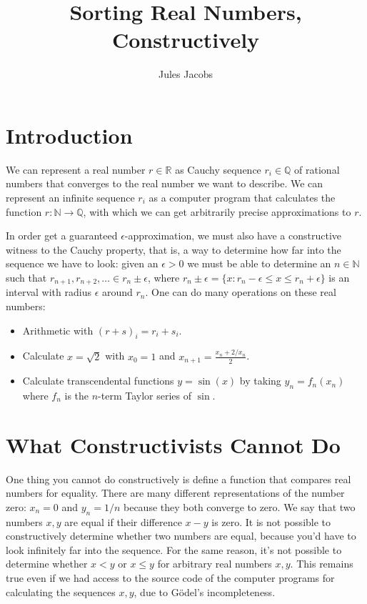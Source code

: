 \documentclass[a4paper, 11pt]{article}
\title{Sorting Real Numbers, Constructively}
\author{Jules Jacobs}
\newcommand{\N}{\mathbb{N}}
\newcommand{\Q}{\mathbb{Q}}
\newcommand{\R}{\mathbb{R}}
\begin{document}
\maketitle

\section{Introduction}

We can represent a real number $r\in \R$ as Cauchy sequence $r_i \in \Q$ of rational numbers that converges to the real number we want to describe. We can represent an infinite sequence $r_i$ as a computer program that calculates the function $r : \N \to \Q$, with which we can get arbitrarily precise approximations to $r$.

In order get a guaranteed $\epsilon$-approximation, we must also have a constructive witness to the Cauchy property, that is, a way to determine how far into the sequence we have to look: given an $\epsilon > 0$ we must be able to determine an $n \in \N$ such that $r_{n+1},r_{n+2},\dots \in r_n \pm \epsilon$, where $r_n \pm \epsilon = \{x : r_n - \epsilon \leq x \leq r_n + \epsilon \}$ is an interval with radius $\epsilon$ around $r_n$. One can do many operations on these real numbers:
\begin{itemize}
  \item Arithmetic with $(r+s)_i = r_i + s_i$.
  \item Calculate $x = \sqrt{2}$ with $x_0 = 1$ and $x_{n+1} = \frac{x_n + 2/x_n}{2}$.
  \item Calculate transcendental functions $y = \sin(x)$ by taking $y_n = f_n(x_n)$ where $f_n$ is the $n$-term Taylor series of $\sin$.
\end{itemize}

\section{What Constructivists Cannot Do}

One thing you cannot do constructively is define a function that compares real numbers for equality. There are many different representations of the number zero: $x_n = 0$ and $y_n = 1/n$ because they both converge to zero. We say that two numbers $x,y$ are equal if their difference $x-y$ is zero. It is not possible to constructively determine whether two numbers are equal, because you'd have to look infinitely far into the sequence. For the same reason, it's not possible to determine whether $x < y$ or $x \leq y$ for arbitrary real numbers $x,y$. This remains true even if we had access to the source code of the computer programs for calculating the sequences $x,y$, due to Gödel's incompleteness.
\end{document}
